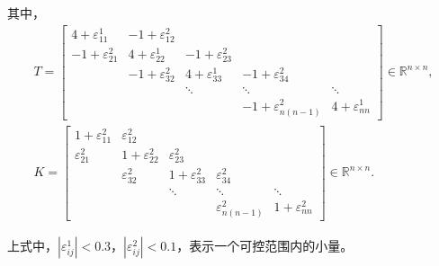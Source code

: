 \documentclass[lang=cn,10pt]{elegantbook}
\begin{document}
其中，
\begin{align}
  T=\begin{bmatrix}
    4+\varepsilon^1_{11} & -1+\varepsilon^2_{12} & \\
    -1+\varepsilon^2_{21} & 4+\varepsilon^1_{22} & -1+\varepsilon^2_{23} & \\
    & -1+\varepsilon^2_{32} & 4+\varepsilon^1_{33} & -1+\varepsilon^2_{34} &\\
    & & \ddots & \ddots & \ddots\\
    & & & -1+\varepsilon^2_{n(n-1)} & 4+\varepsilon^1_{nn}
  \end{bmatrix}\in\mathbb{R}^{n\times n},\\
  K=\begin{bmatrix}
    1+\varepsilon^2_{11} & \varepsilon^2_{12} & \\
    \varepsilon^2_{21} & 1+\varepsilon^2_{22} & \varepsilon^2_{23} & \\
    & \varepsilon^2_{32} & 1+\varepsilon^2_{33} & \varepsilon^2_{34} &\\
    & & \ddots & \ddots & \ddots\\
    & & & \varepsilon^2_{n(n-1)} & 1+\varepsilon^2_{nn}
  \end{bmatrix}\in\mathbb{R}^{n\times n}.
\end{align}

上式中，$|\varepsilon^1_{ij}|<0.3$，$|\varepsilon^2_{ij}|<0.1$，表示一个可控范围内的小量。
\end{document}
